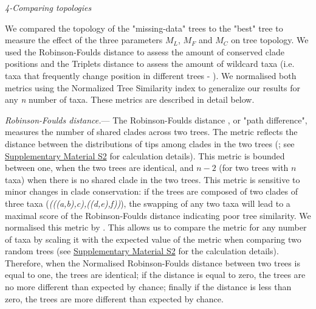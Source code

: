 \documentclass[12pt,letterpaper]{article}
\renewcommand{\subsection}[1]{%
\bigskip
\begin{center}
\begin{large}
\normalfont\itshape #1
\end{large}
\end{center}}
\renewcommand{\subsubsection}[1]{%
\vspace{2ex}
\noindent
\textit{#1.}---}
\begin{document}
\subsection{4-Comparing topologies}
We compared the topology of the "missing-data" trees to the "best" tree to measure the effect of the three parameters $M_{L}$, $M_{F}$ and $M_{C}$ on tree topology. We used the Robinson-Foulds distance \citep{RF1981} to assess the amount of conserved clade positions and the Triplets distance \citep{dobson1975triplets} to assess the amount of wildcard taxa  (i.e. taxa that frequently change position in different trees - \citealt{kearneyfragmentary2002}). We normalised both metrics using the Normalized Tree Similarity index \citep{Bogdanowicz2012} to generalize our results for any \textit{n} number of taxa. These metrics are described in detail below.

\subsubsection{Robinson-Foulds distance}
The Robinson-Foulds distance \citep{RF1981}, or "path difference", measures the number of shared clades across two trees. The metric reflects the distance between the distributions of tips among clades in the two trees (\citealt{RF1981}; see \hyperref[SupplementaryMaterial]{Supplementary Material S2} for calculation details). This metric is bounded between one, when the two trees are identical, and $n-2$ (for two trees with $n$ taxa) when there is no shared clade in the two trees. This metric is sensitive to minor changes in clade conservation: if the trees are composed of two clades of three taxa (\textit{(((a,b),c),((d,e),f))}), the swapping of any two taxa will lead to a maximal score of the Robinson-Foulds distance indicating poor tree similarity. We normalised this metric by %
\citep{Bogdanowicz2012}. This allows us to compare the metric for any number of taxa by scaling it with the expected value of the metric when comparing two random trees (see \hyperref[SupplementaryMaterial]{Supplementary Material S2} for the calculation details). Therefore, when the Normalised Robinson-Foulds distance between two trees is equal to one, the trees are identical; if the distance is equal to zero, the trees are no more different than expected by chance; finally if the distance is less than zero, the trees are more different than expected by chance.
\end{document}

